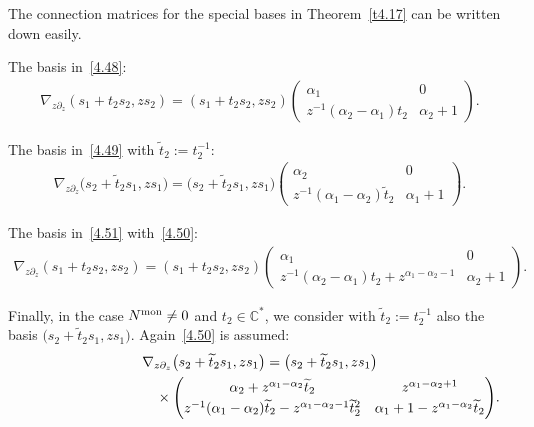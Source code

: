\documentclass[10pt,a4paper]{amsart}
\numberwithin{equation}{section}
\numberwithin{figure}{section}
\newcommand{\C}{{\mathbb C}}
\newcommand{\www}{\widetilde}
\newcommand{\paa}{\partial}
\newcommand{\nnn}{\nabla}
\begin{document}
\begin{Remark}\label{t4.19}
The connection matrices for the special bases in
Theorem~\ref{t4.17} can be written down easily.

The basis in~\eqref{4.48}:
\begin{gather}\label{4.57}
\nnn_{z\paa_z}(s_1+t_2s_2,zs_2)=
(s_1+t_2s_2,zs_2)\begin{pmatrix}\alpha_1 & 0 \\
z^{-1}(\alpha_2-\alpha_1)t_2 & \alpha_2+1\end{pmatrix}\!.
\end{gather}

The basis in~\eqref{4.49} with $\www t_2:=t_2^{-1}$:
\begin{gather}\label{4.58}
\nnn_{z\paa_z}\big(s_2+\www t_2s_1,zs_1\big)=
\big(s_2+\www t_2s_1,zs_1\big)\begin{pmatrix}\alpha_2 & 0 \\
z^{-1}(\alpha_1-\alpha_2)\www t_2 & \alpha_1+1\end{pmatrix}\!.
\end{gather}

The basis in~\eqref{4.51} with~\eqref{4.50}:
\begin{gather}\label{4.59}
\nnn_{z\paa_z}(s_1+t_2s_2,zs_2)=
(s_1+t_2s_2,zs_2)
\begin{pmatrix}\alpha_1 & 0 \\
z^{-1}(\alpha_2-\alpha_1)t_2 +z^{\alpha_1-\alpha_2-1}
& \alpha_2+1\end{pmatrix}\!.
\end{gather}

Finally, in the case $N^{\rm mon}\neq 0$ and $t_2\in\C^*$,
we consider with $\www t_2:=t_2^{-1}$ also the basis
$\big(s_2+\www t_2 s_1,zs_1\big)$. Again~\eqref{4.50} is assumed:
\begin{gather}
\nnn_{z\paa_z}\big(s_2+\www t_2s_1,zs_1\big)=\big(s_2+\www t_2s_1,zs_1\big)\nonumber
\\ \hphantom{\nnn_{z\paa_z}(s_2+\www t_2s_1,zs_1)=}
{}\times\begin{pmatrix}\alpha_2
+z^{\alpha_1-\alpha_2}\www t_2 &
z^{\alpha_1-\alpha_2+1} \\[.5ex]
z^{-1}(\alpha_1-\alpha_2)\www t_2 -z^{\alpha_1-\alpha_2-1}
\www t_2^2 & \alpha_1+1-z^{\alpha_1-\alpha_2}\www t_2
\end{pmatrix}\!.
\end{gather}\label{4.60}
\end{Remark}
\end{document}

